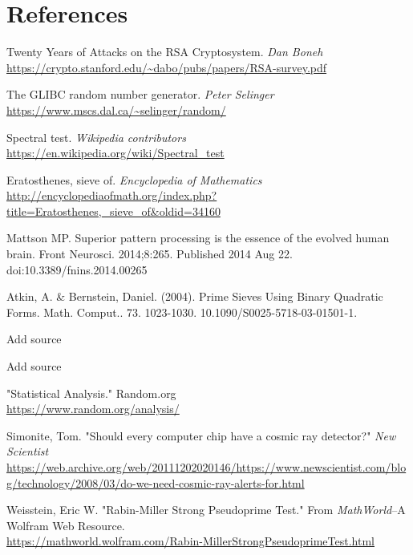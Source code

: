 \documentclass{article}
\begin{document}
\clearpage
\section{References}
\begin{thebibliography}{6}
Twenty Years of Attacks on the RSA Cryptosystem.
\textit{Dan Boneh}
\\\url{https://crypto.stanford.edu/~dabo/pubs/papers/RSA-survey.pdf}

The GLIBC random number generator.
\textit{Peter Selinger}
\\\url{https://www.mscs.dal.ca/~selinger/random/}

Spectral test.
\textit{Wikipedia contributors}
\\\url{https://en.wikipedia.org/wiki/Spectral_test}

Eratosthenes, sieve of.
\textit{Encyclopedia of Mathematics}\\
\url{http://encyclopediaofmath.org/index.php?title=Eratosthenes,_sieve_of&oldid=34160}

Mattson MP. Superior pattern processing is the essence of the evolved human brain. Front Neurosci. 2014;8:265. Published 2014 Aug 22. doi:10.3389/fnins.2014.00265

Atkin, A. \& Bernstein, Daniel. (2004). Prime Sieves Using Binary Quadratic Forms. Math. Comput.. 73. 1023-1030. 10.1090/S0025-5718-03-01501-1. 

Add source

Add source

"Statistical Analysis." Random.org
\\\url{https://www.random.org/analysis/}

Simonite, Tom. "Should every computer chip have a cosmic ray detector?" \textit{New Scientist}
\\\url{https://web.archive.org/web/20111202020146/https://www.newscientist.com/blog/technology/2008/03/do-we-need-cosmic-ray-alerts-for.html}

Weisstein, Eric W. "Rabin-Miller Strong Pseudoprime Test." From \textit{MathWorld}--A Wolfram Web Resource.
\\\url{https://mathworld.wolfram.com/Rabin-MillerStrongPseudoprimeTest.html}
\end{thebibliography}
         
\end{document}
